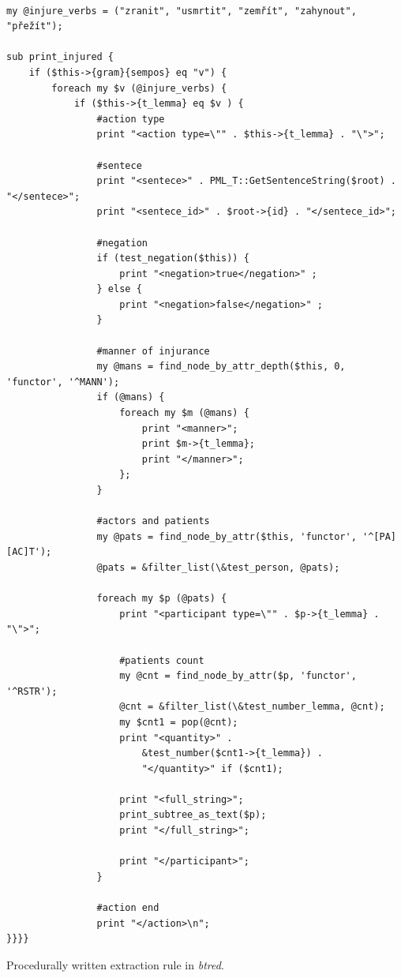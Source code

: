 \begin{listing}
\begin{verbatim}

my @injure_verbs = ("zranit", "usmrtit", "zemřít", "zahynout", "přežít");

sub print_injured {
	if ($this->{gram}{sempos} eq "v") {
		foreach my $v (@injure_verbs) {
			if ($this->{t_lemma} eq $v ) {
				#action type
				print "<action type=\"" . $this->{t_lemma} . "\">";

				#sentece
				print "<sentece>" . PML_T::GetSentenceString($root) . "</sentece>";
				print "<sentece_id>" . $root->{id} . "</sentece_id>";
				
				#negation
				if (test_negation($this)) {
					print "<negation>true</negation>" ;					
				} else {
					print "<negation>false</negation>" ;										
				}
								
				#manner of injurance
				my @mans = find_node_by_attr_depth($this, 0, 'functor', '^MANN');
				if (@mans) {
					foreach my $m (@mans) {
						print "<manner>"; 
						print $m->{t_lemma};
						print "</manner>"; 
					};
				}
				
				#actors and patients
				my @pats = find_node_by_attr($this, 'functor', '^[PA][AC]T');
				@pats = &filter_list(\&test_person, @pats);
				
				foreach my $p (@pats) {
					print "<participant type=\"" . $p->{t_lemma} . "\">";

					#patients count
					my @cnt = find_node_by_attr($p, 'functor', '^RSTR');
					@cnt = &filter_list(\&test_number_lemma, @cnt);
					my $cnt1 = pop(@cnt);
					print "<quantity>" . 
						&test_number($cnt1->{t_lemma}) . 
						"</quantity>" if ($cnt1);
	
					print "<full_string>";
					print_subtree_as_text($p);
					print "</full_string>";

					print "</participant>";
				}
				
				#action end
				print "</action>\n";											
}}}}
\end{verbatim}
\caption{Procedurally written extraction rule in \emph{btred}.}
\label{lst:btred_rule}
\end{listing}



